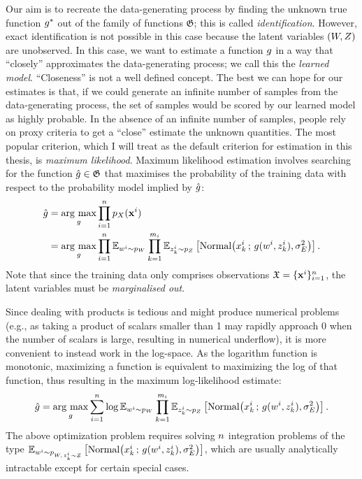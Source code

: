 \documentclass[../thesis.tex]{subfiles}
\begin{document}
Our aim is to recreate the data-generating process by finding the unknown true function $g^*$ out of the family of functions $\mathfrak{G}$; this is called \textit{identification}. However, exact identification is not possible in this case because the latent variables $(\myrv{w}, \myrv{z})$ are unobserved. In this case, we want to estimate a function $g$ in a way that ``closely'' approximates the data-generating process; we call this the \textit{learned model}. ``Closeness'' is not a well defined concept. The best we can hope for our estimates is that, if we could generate an infinite number of samples from the data-generating process, the set of samples would be scored by our learned model as highly probable. In the absence of an infinite number of samples, people rely on proxy criteria to get a ``close'' estimate the unknown quantities. The most popular criterion, which I will treat as the default criterion for estimation in this thesis, is \textit{maximum likelihood}. Maximum likelihood estimation involves searching for the function $\hat{g} \in \mathfrak{G}$ that maximises the probability of the training data with respect to the probability model implied by $\hat{g}$:
\begin{align}
    \hat{\myfunc{g}} &= \underset{\myfunc{g}}{\mathrm{arg~max}} \prod_{i=1}^\mycnt{n} \myfunc{p}_{\myrv{x}} (\mygroup{\myvect{x}}^i) \\
    &= \underset{\myfunc{g}}{\mathrm{arg~max}} \prod_{i=1}^\mycnt{n} \myexp{p}{\myvect{w}^i}{\myrv{w}} \prod_{k=1}^{\mycnt{m}_i} \myexp{p}{\myvect{z}^i_k}{\myrv{z}} \left[ \mathrm{Normal} \bigl(\myvect{x}^i_k \,;\, \myfunc{g}(\myvect{w}^i, \myvect{z}^i_k), \sigma^2_{\myrv{e}}\bigr) \right].
\end{align}
Note that since the training data only comprises observations $\mathfrak{X} = \{\mathbf{{x}}^i\}_{i=1}^n$, the latent variables must be \textit{marginalised out}.

Since dealing with products is tedious and might produce numerical problems (e.g., as taking a product of scalars smaller than 1 may rapidly approach 0 when the number of scalars is large, resulting in numerical underflow), it is more convenient to instead work in the log-space. As the logarithm function is monotonic, maximizing a function is equivalent to maximizing the log of that function, thus resulting in the maximum log-likelihood estimate:
\[
    \hat{\myfunc{g}} = \underset{\myfunc{g}}{\mathrm{arg~max}} \sum_{i=1}^\mycnt{n} \log \myexp{p}{\myvect{w}^i}{\myrv{w}} \prod_{k=1}^{\mycnt{m}_i} \myexp{p}{\myvect{z}^i_k}{\myrv{z}} \left[ \mathrm{Normal} \bigl(\myvect{x}^i_k \,;\, \myfunc{g}(\myvect{w}^i, \myvect{z}^i_k), \sigma^2_{\myrv{e}}\bigr) \right].
\]
The above optimization problem requires solving $n$ integration problems of the type $\myexp{p}{\myvect{w}^i}{\myrv{w}, \, \myvect{z}^i_k \sim \myrv{z}} \left[ \mathrm{Normal} \bigl(\myvect{x}^i_k \,;\, \myfunc{g}(\myvect{w}^i, \myvect{z}^i_k), \sigma^2_{\myrv{e}}\bigr) \right]$, which are usually analytically intractable except for certain special cases. 
\end{document}
